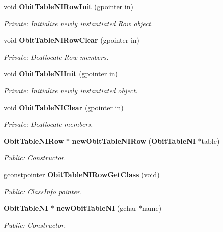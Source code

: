 \begin{CompactItemize}
\item 
void {\bf Obit\-Table\-NIRow\-Init} (gpointer in)
\begin{CompactList}\small\item\em Private: Initialize newly instantiated Row object. \item\end{CompactList}\item 
void {\bf Obit\-Table\-NIRow\-Clear} (gpointer in)
\begin{CompactList}\small\item\em Private: Deallocate Row members. \item\end{CompactList}\item 
void {\bf Obit\-Table\-NIInit} (gpointer in)
\begin{CompactList}\small\item\em Private: Initialize newly instantiated object. \item\end{CompactList}\item 
void {\bf Obit\-Table\-NIClear} (gpointer in)
\begin{CompactList}\small\item\em Private: Deallocate members. \item\end{CompactList}\item 
{\bf Obit\-Table\-NIRow} $\ast$ {\bf new\-Obit\-Table\-NIRow} ({\bf Obit\-Table\-NI} $\ast$table)
\begin{CompactList}\small\item\em Public: Constructor. \item\end{CompactList}\item 
gconstpointer {\bf Obit\-Table\-NIRow\-Get\-Class} (void)
\begin{CompactList}\small\item\em Public: Class\-Info pointer. \item\end{CompactList}\item 
{\bf Obit\-Table\-NI} $\ast$ {\bf new\-Obit\-Table\-NI} (gchar $\ast$name)
\begin{CompactList}\small\item\em Public: Constructor. \item\end{CompactList}\item 

\end{CompactItemize}
